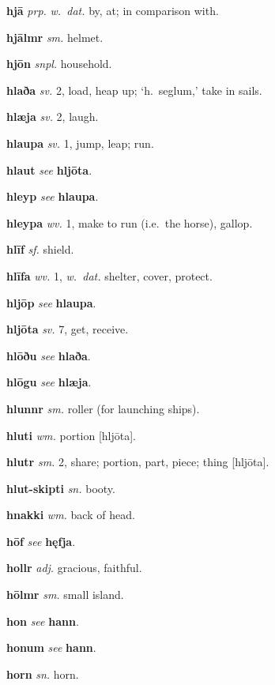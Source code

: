 \documentclass[12pt,letterpaper]{book}
\begin{document}
\noindent
\textbf{hjā} \textit{prp.} \textit{w.\ dat.} by, at; in comparison with.

\noindent
\textbf{hjālmr} \textit{sm.} helmet.

\noindent
\textbf{hjōn} \textit{snpl.} household.

\noindent
\textbf{hlaða} \textit{sv.} 2, load, heap up; `h.\ seglum,' take in sails.

\noindent
\textbf{hlæja} \textit{sv.} 2, laugh.

\noindent
\textbf{hlaupa} \textit{sv.} 1, jump, leap; run.

\noindent
\textbf{hlaut} \textit{} \textit{see} \textbf{hljōta}.

\noindent
\textbf{hleyp} \textit{} \textit{see} \textbf{hlaupa}.

\noindent
\textbf{hleypa} \textit{wv.} 1, make to run (i.e.\ the horse), gallop.

\noindent
\textbf{hlīf} \textit{sf.} shield.

\noindent
\textbf{hlīfa} \textit{wv.} 1, \textit{w.\ dat.} shelter, cover, protect.

\noindent
\textbf{hljōp} \textit{} \textit{see} \textbf{hlaupa}.

\noindent
\textbf{hljōta} \textit{sv.} 7, get, receive.

\noindent
\textbf{hlōðu} \textit{} \textit{see} \textbf{hlaða}.

\noindent
\textbf{hlōgu} \textit{} \textit{see} \textbf{hlæja}.

\noindent
\textbf{hlunnr} \textit{sm.} roller (for launching ships).

\noindent
\textbf{hluti} \textit{wm.} portion [hljōta].

\noindent
\textbf{hlutr} \textit{sm.} 2, share; portion, part, piece; thing [hljōta].

\noindent
\textbf{hlut-skipti} \textit{sn.} booty.

\noindent
\textbf{hnakki} \textit{wm.} back of head.

\noindent
\textbf{hōf} \textit{} \textit{see} \textbf{hęfja}.

\noindent
\textbf{hollr} \textit{adj.} gracious, faithful.

\noindent
\textbf{hōlmr} \textit{sm.} small island.

\noindent
\textbf{hon} \textit{} \textit{see} \textbf{hann}.

\noindent
\textbf{honum} \textit{} \textit{see} \textbf{hann}.

\noindent
\textbf{horn} \textit{sn.} horn.
\end{document}

